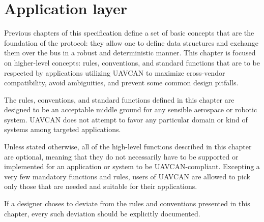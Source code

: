 \chapter{Application layer}\label{sec:application_layer}

Previous chapters of this specification define a set of basic concepts that are the foundation of the protocol:
they allow one to define data structures and exchange them over the bus in a robust and deterministic manner.
This chapter is focused on higher-level concepts: rules, conventions, and standard functions that are to be
respected by applications utilizing UAVCAN to maximize cross-vendor compatibility, avoid ambiguities, and
prevent some common design pitfalls.

The rules, conventions, and standard functions defined in this chapter are designed to be an acceptable middle
ground for any sensible aerospace or robotic system.
UAVCAN does not attempt to favor any particular domain or kind of systems among targeted applications.

Unless stated otherwise, all of the high-level functions described in this chapter are optional,
meaning that they do not necessarily have to be supported or implemented for an application or system to be
UAVCAN-compliant.
Excepting a very few mandatory functions and rules, users of UAVCAN are allowed to pick only those
that are needed and suitable for their applications.

If a designer choses to deviate from the rules and conventions presented in this chapter,
every such deviation should be explicitly documented.

\clearpage
\clearpage
